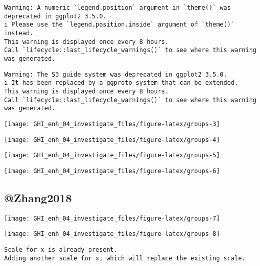 \documentclass[
  10pt,
  a4paper,oneside]{article}
\begin{document}
\begin{verbatim}
Warning: A numeric `legend.position` argument in `theme()` was deprecated in ggplot2 3.5.0.
i Please use the `legend.position.inside` argument of `theme()` instead.
This warning is displayed once every 8 hours.
Call `lifecycle::last_lifecycle_warnings()` to see where this warning was generated.
\end{verbatim}

\begin{verbatim}
Warning: The S3 guide system was deprecated in ggplot2 3.5.0.
i It has been replaced by a ggproto system that can be extended.
This warning is displayed once every 8 hours.
Call `lifecycle::last_lifecycle_warnings()` to see where this warning was generated.
\end{verbatim}

\begin{center}\texttt{[image: GHI\_enh\_04\_investigate\_files/figure-latex/groups-3]} \end{center}

\begin{center}\texttt{[image: GHI\_enh\_04\_investigate\_files/figure-latex/groups-4]} \end{center}

\begin{center}\texttt{[image: GHI\_enh\_04\_investigate\_files/figure-latex/groups-5]} \end{center}

\begin{center}\texttt{[image: GHI\_enh\_04\_investigate\_files/figure-latex/groups-6]} \end{center}

\hypertarget{zhang2018}{%
\subsection{@Zhang2018}\label{zhang2018}}

\begin{center}\texttt{[image: GHI\_enh\_04\_investigate\_files/figure-latex/groups-7]} \end{center}

\begin{center}\texttt{[image: GHI\_enh\_04\_investigate\_files/figure-latex/groups-8]} \end{center}

\begin{verbatim}
Scale for x is already present.
Adding another scale for x, which will replace the existing scale.
\end{verbatim}
\end{document}

